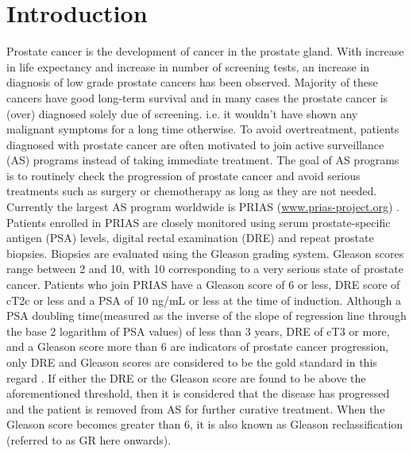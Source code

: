 
\section{Introduction}
\label{sec : introduction}
Prostate cancer is the development of cancer in the prostate gland. With increase in life expectancy and increase in number of screening tests, an increase in diagnosis of low grade prostate cancers has been observed. Majority of these cancers have good long-term survival and in many cases the prostate cancer is (over) diagnosed solely due of screening. i.e. it wouldn't have shown any malignant symptoms for a long time otherwise. To avoid overtreatment, patients diagnosed with prostate cancer are often motivated to join active surveillance (AS) programs instead of taking immediate treatment. The goal of AS programs is to routinely check the progression of prostate cancer and avoid serious treatments such as surgery or chemotherapy as long as they are not needed.\\

Currently the largest AS program worldwide is PRIAS (\url{www.prias-project.org}) \citep{bokhorst2015compliance}. Patients enrolled in PRIAS are closely monitored using serum prostate-specific antigen (PSA) levels, digital rectal examination (DRE) and repeat prostate biopsies. Biopsies are evaluated using the Gleason grading system. Gleason scores range between 2 and 10, with 10 corresponding to a very serious state of prostate cancer. Patients who join PRIAS have a Gleason score of 6 or less, DRE score of cT2c or less and a PSA of 10 ng/mL or less at the time of induction. Although a PSA doubling time(measured as the inverse of the slope of regression line through the base 2 logarithm of PSA values) of less than 3 years, DRE of cT3 or more, and a Gleason score more than 6 are indicators of prostate cancer progression, only DRE and Gleason scores are considered to be the gold standard in this regard \citep{bokhorst2016decade}. If either the DRE or the Gleason score are found to be above the aforementioned threshold, then it is considered that the disease has progressed and the patient is removed from AS for further curative treatment. When the Gleason score becomes greater than 6, it is also known as Gleason reclassification (referred to as GR here onwards).\\

